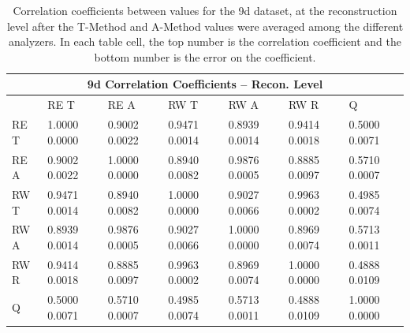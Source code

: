 \begin{table}
\setlength\tabcolsep{15pt}
\small
\centering
\renewcommand{\arraystretch}{1.4}
\begin{tabularx}{0.8\linewidth}{@{\extracolsep{\fill}}lXXXXXX}
  \toprule
  	\multicolumn{7}{c}{{\normalsize 9d Correlation Coefficients -- Recon. Level}} \\
  \midrule
  	       & RE T & RE A & RW T & RW A & RW R & \quad Q \\
  \midrule
	RE T   & 1.0000 0.0000 & 0.9002 0.0022 & 0.9471 0.0014 & 0.8939 0.0014 & 0.9414 0.0018 & 0.5000 0.0071  \\
	RE A   & 0.9002 0.0022 & 1.0000 0.0000 & 0.8940 0.0082 & 0.9876 0.0005 & 0.8885 0.0097 & 0.5710 0.0007  \\
	RW T   & 0.9471 0.0014 & 0.8940 0.0082 & 1.0000 0.0000 & 0.9027 0.0066 & 0.9963 0.0002 & 0.4985 0.0074  \\
	RW A   & 0.8939 0.0014 & 0.9876 0.0005 & 0.9027 0.0066 & 1.0000 0.0000 & 0.8969 0.0074 & 0.5713 0.0011  \\
	RW R   & 0.9414 0.0018 & 0.8885 0.0097 & 0.9963 0.0002 & 0.8969 0.0074 & 1.0000 0.0000 & 0.4888 0.0109  \\
	Q      & 0.5000 0.0071 & 0.5710 0.0007 & 0.4985 0.0074 & 0.5713 0.0011 & 0.4888 0.0109 & 1.0000 0.0000  \\
  \bottomrule
\end{tabularx}
\caption[]{Correlation coefficients between \R values for the 9d dataset, at the reconstruction level after the \RW T-Method and A-Method \R values were averaged among the different analyzers. In each table cell, the top number is the correlation coefficient and the bottom number is the error on the coefficient.}
\label{tab:Corrs_9d_recon}
\end{table}


